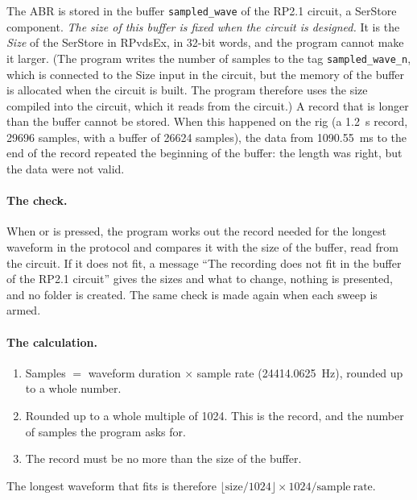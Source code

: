 The ABR is stored in the buffer \texttt{sampled\_wave} of the RP2.1 circuit, a SerStore
component. \emph{The size of this buffer is fixed when the circuit is designed.} It is
the \emph{Size} of the SerStore in RPvdsEx, in 32-bit words, and the program cannot make it
larger. (The program writes the number of samples to the tag \texttt{sampled\_wave\_n},
which is connected to the Size input in the circuit, but the memory of the buffer is
allocated when the circuit is built. The program therefore uses the size compiled into
the circuit, which it reads from the circuit.) A record that is longer than the buffer
cannot be stored. When this happened on the rig (a 1.2~s record, 29696 samples, with a
buffer of 26624 samples), the data from 1090.55~ms to the end of the record repeated the
beginning of the buffer: the length was right, but the data were not valid.

\paragraph{The check.} When  or  is pressed,
the program works out the record needed for the longest waveform in the protocol and
compares it with the size of the buffer, read from the circuit. If it does not fit, a
message ``The recording does not fit in the buffer of the RP2.1 circuit'' gives the
sizes and what to change, nothing is presented, and no folder is created. The same check
is made again when each sweep is armed.

\paragraph{The calculation.}
\begin{enumerate}
\item Samples $=$ waveform duration $\times$ sample rate (24414.0625~Hz), rounded up to a
  whole number.
\item Rounded up to a whole multiple of 1024. This is the record, and the number of
  samples the program asks for.
\item The record must be no more than the size of the buffer.
\end{enumerate}
The longest waveform that fits is therefore
$\lfloor \mathrm{size}/1024 \rfloor \times 1024 / \mathrm{sample\ rate}$.

